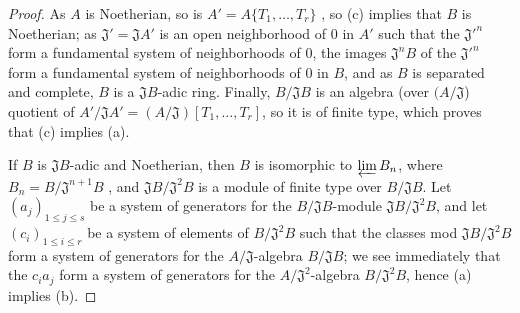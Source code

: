 \begin{proof}
\label{proof-0.7.5.5}
As $A$ is Noetherian, so is $A'=A\{T_1,\dots,T_r\}$ , so
(c) implies that $B$ is Noetherian; as $\mathfrak{J}'=\mathfrak{J}A'$ is an open neighborhood
of $0$ in $A'$ such that the ${\mathfrak{J}'}^n$ form a fundamental system of neighborhoods of
$0$, the images $\mathfrak{J}^n B$ of the ${\mathfrak{J}'}^n$ form a fundamental system of
neighborhoods of $0$ in $B$, and as $B$ is separated and complete, $B$ is a $\mathfrak{J}B$-adic
ring. Finally, $B/\mathfrak{J}B$ is an algebra (over $(A/\mathfrak{J}$) quotient of
$A'/\mathfrak{J}A'=(A/\mathfrak{J})[T_1,\dots,T_r]$, so it is of finite type, which proves that
(c) implies (a).

If $B$ is $\mathfrak{J}B$-adic and Noetherian, then $B$ is isomorphic to $\varprojlim B_n$, where
$B_n=B/\mathfrak{J}^{n+1}B$ , and $\mathfrak{J}B/\mathfrak{J}^2 B$
is a module of finite type over $B/\mathfrak{J}B$. Let $(a_j)_{1\leq j\leq s}$ be a
system of generators for the $B/\mathfrak{J}B$-module $\mathfrak{J}B/\mathfrak{J}^2 B$, and let
$(c_i)_{1\leq i\leq r}$ be a system of elements of $B/\mathfrak{J}^2 B$ such that the
classes
mod $\mathfrak{J}B/\mathfrak{J}^2 B$ form a system of generators for the $A/\mathfrak{J}$-algebra
$B/\mathfrak{J}B$; we see immediately that the $c_i a_j$ form a system of generators for the
$A/\mathfrak{J}^2$-algebra $B/\mathfrak{J}^2 B$, hence (a) implies (b).


\end{proof}
